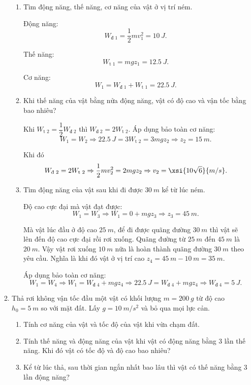 \begin{enumerate}[label=\bfseries Câu \arabic*:]
{	}
	
	\hideall
	{	
			\begin{enumerate}[label=\alph*)]
			\item Tìm động năng, thế năng, cơ năng của vật ở vị trí ném.
			
			Động năng:
			$$W_\text{đ 1} = \dfrac{1}{2}mv_1^2  = \SI{10}{J}.$$
			
			Thế năng:
			$$W_\text{t 1} = mgz_1 = \SI{12.5}{J}.$$
			
			Cơ năng:
			$$W_1 = W_\text{đ 1} + W_\text{t 1} = \SI{22.5}{J}.$$
			
			\item Khi thế năng của vật bằng nửa động năng, vật có độ cao và vận tốc bằng bao nhiêu?
			
			Khi $W_\text{t 2} = \dfrac{1}{2} W_\text{đ 2}$ thì $W_\text{đ 2} = 2 W_\text{t 2}$. Áp dụng bảo toàn cơ năng:
			$$W_1 = W_2 \Rightarrow \SI{22.5}{J} = 3 W_\text{t 2} = 3 mgz_2 \Rightarrow z_2 = \SI{15}{m}.$$
			
			Khi đó $$W_\text{đ 2} = 2 W_\text{t 2} \Rightarrow \dfrac{1}{2}mv_2^2 = 2 mgz_2 \Rightarrow v_2 = \xsi{10\sqrt 6}{m/s}.$$
			
			\item Tìm động năng của vật sau khi đi được $\SI{30}{m}$ kể từ lúc ném.
			
			Độ cao cực đại mà vật đạt được:
			$$W_1 = W_3 \Rightarrow W_1 = 0 + mgz_3 \Rightarrow z_3 = \SI{45}{m}.$$
			
			Mà vật lúc đầu ở độ cao $\SI{25}{m}$, để đi được quãng đường $\SI{30}{m}$ thì vật sẽ lên đến độ cao cực đại rồi rơi xuống. Quãng đường từ $\SI{25}{m}$ đến $\SI{45}{m}$ là $\SI{20}{m}$. Vậy vật rơi xuống $\SI{10}{m}$ nữa là hoàn thành quãng đường $\SI{30}{m}$ theo yêu cầu. Nghĩa là khi đó vật ở vị trí cao $z_4 = \SI{45}{m} - \SI{10}{m} = \SI{35}{m}$.
			
			Áp dụng bảo toàn cơ năng:
			$$W_1 = W_4 \Rightarrow W_1 = W_\text{đ 4} + mgz_4 \Rightarrow \SI{22.5}{J} = W_\text{đ 4} + mgz_4 \Rightarrow W_\text{đ 4} = \SI{5}{J}.$$
		\end{enumerate}
	}
		\item {}
	
	
	{
		Thả rơi không vận tốc đầu một vật có khối lượng $m=\SI{200}{g}$ từ độ cao $h_0=\SI{5}{m}$ so với mặt đất. Lấy $g=\SI{10}{m/s^2}$ và bỏ qua mọi lực cản.
		\begin{enumerate}[label=\alph*)]
			\item Tính cơ năng của vật và tốc độ của vật khi vừa chạm đất.
			\item Tính thế năng và động năng của vật khi vật có động năng bằng 3 lần thế năng. Khi đó vật có tốc độ và độ cao bao nhiêu?
			\item Kể từ lúc thả, sau thời gian ngắn nhất bao lâu thì vật có thế năng bằng 3 lần động năng?
		\end{enumerate}
	}
	

\end{enumerate}
